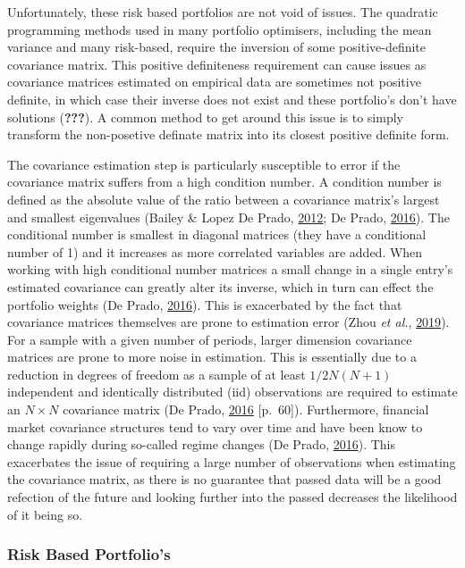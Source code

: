 \documentclass[11pt,preprint, authoryear]{elsarticle}
\numberwithin{equation}{section}
\numberwithin{figure}{section}
\numberwithin{table}{section}
\begin{document}
Unfortunately, these risk based portfolios are not void of issues. The
quadratic programming methods used in many portfolio optimisers,
including the mean variance and many risk-based, require the inversion
of some positive-definite covariance matrix. This positive definiteness
requirement can cause issues as covariance matrices estimated on
empirical data are sometimes not positive definite, in which case their
inverse does not exist and these portfolio's don't have solutions
({\textbf{???}}). A common method to get around this issue is to simply
transform the non-posetive definate matrix into its closest positive
definite form.

The covariance estimation step is particularly susceptible to error if
the covariance matrix suffers from a high condition number. A condition
number is defined as the absolute value of the ratio between a
covariance matrix's largest and smallest eigenvalues (Bailey \& Lopez De
Prado, \protect\hyperlink{ref-lopez2012}{2012}; De Prado,
\protect\hyperlink{ref-lopez}{2016}). The conditional number is smallest
in diagonal matrices (they have a conditional number of 1) and it
increases as more correlated variables are added. When working with high
conditional number matrices a small change in a single entry's estimated
covariance can greatly alter its inverse, which in turn can effect the
portfolio weights (De Prado, \protect\hyperlink{ref-lopez}{2016}). This
is exacerbated by the fact that covariance matrices themselves are prone
to estimation error (Zhou \emph{et al.},
\protect\hyperlink{ref-zhou2019}{2019}). For a sample with a given
number of periods, larger dimension covariance matrices are prone to
more noise in estimation. This is essentially due to a reduction in
degrees of freedom as a sample of at least \(1/2N(N+1)\) independent and
identically distributed (iid) observations are required to estimate an
\(N\times N\) covariance matrix (De Prado,
\protect\hyperlink{ref-lopez}{2016} {[}p.~60{]}). Furthermore, financial
market covariance structures tend to vary over time and have been know
to change rapidly during so-called regime changes (De Prado,
\protect\hyperlink{ref-lopez}{2016}). This exacerbates the issue of
requiring a large number of observations when estimating the covariance
matrix, as there is no guarantee that passed data will be a good
refection of the future and looking further into the passed decreases
the likelihood of it being so.

\hypertarget{risk-based-portfolios}{%
\subsubsection{Risk Based Portfolio's}\label{risk-based-portfolios}}
\end{document}
